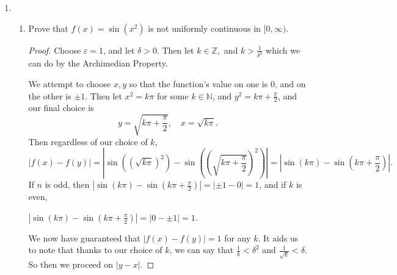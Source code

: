 \documentclass{article}
\begin{document}
\begin{enumerate}
\begin{enumerate}
    \end{enumerate}
        \newpage
\item \begin{enumerate}
        \item Prove that $f\left(x\right)=\sin\left(x^{2}\right)$ is not uniformly continuous in $[0,\infty).$
            \begin{proof} 

                Choose $\varepsilon=1$, and let $\delta>0$. Then let $k\in \mathbb{Z}, $ and $k>\frac{1}{\delta^2}$ 
                which we can do by the Archimedian Property.

                We attempt to choose $x,y$ so that the function's value on one is $0$, and on the other
                is $\pm 1$. Then let $x^2=k\pi$ for some $k\in \mathbb{N}$, and $y^2= k\pi+\frac{\pi}{2}$, 
                and our final choice is 
                \[
                y=\sqrt{k\pi+\frac{\pi}{2}},\quad x=\sqrt{k\pi}
                .\] 
                Then regardless of our choice of $k$, 
                \[
                |f(x)-f(y)|=
                \left|\sin\left(\left(\sqrt{ k\pi}\right)^2\right)
                -\sin\left(\left(\sqrt{ k\pi+\frac{\pi}{2}}\right)^2\right)\right|
                =\left|\sin(k\pi)-\sin\left(k\pi+\frac{\pi}{2}\right)\right|.
                \] 
                If $n$ is odd, then 
                $|\sin(k\pi)-\sin\left(k\pi+\frac{\pi}{2}\right)|=|\pm 1 -0|=1$, and if $k$ is even,

                $|\sin(k\pi)-\sin\left(k\pi+\frac{\pi}{2}\right)|=|0 -\pm 1|=1$.

                We now have guaranteed that $|f(x)-f(y)|=1$ for any $k$. 
                It aids us to note that thanks to our choice of $k$, we can say that 
                $\frac{1}{k}<\delta^2$ and $\frac{1}{\sqrt{k} }<\delta$. So then we proceed
                on $|y-x|$.


\end{proof}
\end{enumerate}
\end{enumerate}
\end{document}
